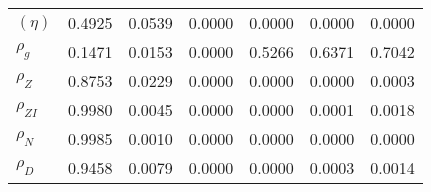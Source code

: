 \begin{center}
\begin{longtable}{lcccccc}
$ (\eta)              $	 & 	          0.4925	 & 	          0.0539	 & 	          0.0000	 & 	          0.0000	 & 	          0.0000	 & 	          0.0000 \\ 
$ {\rho_g}            $	 & 	          0.1471	 & 	          0.0153	 & 	          0.0000	 & 	          0.5266	 & 	          0.6371	 & 	          0.7042 \\ 
$ {\rho_Z}            $	 & 	          0.8753	 & 	          0.0229	 & 	          0.0000	 & 	          0.0000	 & 	          0.0000	 & 	          0.0003 \\ 
$ {\rho_{ZI}}         $	 & 	          0.9980	 & 	          0.0045	 & 	          0.0000	 & 	          0.0000	 & 	          0.0001	 & 	          0.0018 \\ 
$ {\rho_N}            $	 & 	          0.9985	 & 	          0.0010	 & 	          0.0000	 & 	          0.0000	 & 	          0.0000	 & 	          0.0000 \\ 
$ {\rho_D}            $	 & 	          0.9458	 & 	          0.0079	 & 	          0.0000	 & 	          0.0000	 & 	          0.0003	 & 	          0.0014 \\ 
\end{longtable}
 \end{center}
